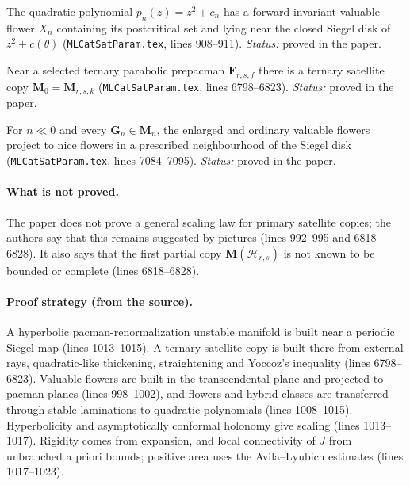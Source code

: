 \begin{theorem}
\label{thm:dl-sat-flowers}
The quadratic polynomial $p_n(z)=z^2+c_n$ has a forward-invariant valuable flower $X_n$ containing its
postcritical set and lying near the closed Siegel disk of $z^2+c(\theta)$ (\texttt{MLCatSatParam.tex}, lines 908--911).
\emph{Status:} proved in the paper.
\end{theorem}

\begin{theorem}
\label{thm:dl-sat-ternary}
Near a selected ternary parabolic prepacman $\mathbf F_{r,s,f}$ there is a ternary satellite copy
$\mathbf M_0=\mathbf M_{r,s,k}$ (\texttt{MLCatSatParam.tex}, lines 6798--6823).  \emph{Status:} proved in the paper.
\end{theorem}

\begin{theorem}
\label{thm:dl-sat-projection}
For $n\ll0$ and every $\mathbf G_n\in\mathbf M_n$, the enlarged and ordinary valuable flowers project to nice
flowers in a prescribed neighbourhood of the Siegel disk (\texttt{MLCatSatParam.tex}, lines 7084--7095).
\emph{Status:} proved in the paper.
\end{theorem}

\paragraph{What is not proved.}
The paper does not prove a general scaling law for primary satellite copies; the authors say that this
remains suggested by pictures (lines 992--995 and 6818--6828).  It also says that the first partial copy
$\mathbf M(\mathcal H_{r,s})$ is not known to be bounded or complete (lines 6818--6828).

\paragraph{Proof strategy (from the source).}
A hyperbolic pacman-renormalization unstable manifold is built near a periodic Siegel map (lines 1013--1015).
A ternary satellite copy is built there from external rays, quadratic-like thickening, straightening and
Yoccoz's inequality (lines 6798--6823).  Valuable flowers are built in the transcendental plane and projected
to pacman planes (lines 998--1002), and flowers and hybrid classes are transferred through stable laminations
to quadratic polynomials (lines 1008--1015).  Hyperbolicity and asymptotically conformal holonomy give scaling
(lines 1013--1017).  Rigidity comes from expansion, and local connectivity of $J$ from unbranched a priori
bounds; positive area uses the Avila--Lyubich estimates (lines 1017--1023).

